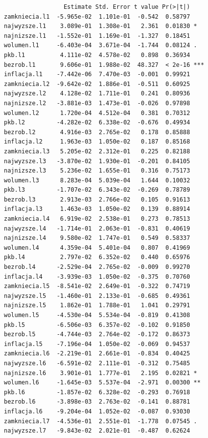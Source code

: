 \documentclass[
  polish,
  letterpaper,
  DIV=11,
  numbers=noendperiod]{scrartcl}
\begin{document}
\begin{verbatim}
                 Estimate Std. Error t value Pr(>|t|)    
zamkniecia.l1  -5.965e-02  1.101e-01  -0.542  0.58797    
najwyzsze.l1    3.089e-01  1.308e-01   2.361  0.01830 *  
najnizsze.l1   -1.552e-01  1.169e-01  -1.327  0.18451    
wolumen.l1     -6.403e-04  3.671e-04  -1.744  0.08124 .  
pkb.l1          4.111e-02  4.578e-02   0.898  0.36934    
bezrob.l1       9.606e-01  1.988e-02  48.327  < 2e-16 ***
inflacja.l1    -7.442e-06  7.470e-03  -0.001  0.99921    
zamkniecia.l2  -9.642e-02  1.886e-01  -0.511  0.60925    
najwyzsze.l2    4.128e-02  1.711e-01   0.241  0.80936    
najnizsze.l2   -3.881e-03  1.473e-01  -0.026  0.97898    
wolumen.l2      1.720e-04  4.512e-04   0.381  0.70312    
pkb.l2         -4.282e-02  6.338e-02  -0.676  0.49934    
bezrob.l2       4.916e-03  2.765e-02   0.178  0.85888    
inflacja.l2     1.963e-03  1.050e-02   0.187  0.85168    
zamkniecia.l3   5.205e-02  2.312e-01   0.225  0.82188    
najwyzsze.l3   -3.870e-02  1.930e-01  -0.201  0.84105    
najnizsze.l3    5.236e-02  1.655e-01   0.316  0.75173    
wolumen.l3      8.283e-04  5.039e-04   1.644  0.10032    
pkb.l3         -1.707e-02  6.343e-02  -0.269  0.78789    
bezrob.l3       2.913e-03  2.766e-02   0.105  0.91613    
inflacja.l3     1.463e-03  1.050e-02   0.139  0.88914    
zamkniecia.l4   6.919e-02  2.538e-01   0.273  0.78513    
najwyzsze.l4   -1.714e-01  2.063e-01  -0.831  0.40619    
najnizsze.l4    9.580e-02  1.747e-01   0.549  0.58337    
wolumen.l4      4.359e-04  5.401e-04   0.807  0.41969    
pkb.l4          2.797e-02  6.352e-02   0.440  0.65976    
bezrob.l4      -2.529e-04  2.765e-02  -0.009  0.99270    
inflacja.l4    -3.939e-03  1.050e-02  -0.375  0.70760    
zamkniecia.l5  -8.541e-02  2.649e-01  -0.322  0.74719    
najwyzsze.l5   -1.460e-01  2.133e-01  -0.685  0.49361    
najnizsze.l5    1.862e-01  1.788e-01   1.041  0.29791    
wolumen.l5     -4.530e-04  5.534e-04  -0.819  0.41308    
pkb.l5         -6.506e-03  6.357e-02  -0.102  0.91850    
bezrob.l5      -4.744e-03  2.764e-02  -0.172  0.86373    
inflacja.l5    -7.196e-04  1.050e-02  -0.069  0.94537    
zamkniecia.l6  -2.219e-01  2.661e-01  -0.834  0.40425    
najwyzsze.l6   -6.591e-02  2.111e-01  -0.312  0.75485    
najnizsze.l6    3.901e-01  1.777e-01   2.195  0.02821 *  
wolumen.l6     -1.645e-03  5.537e-04  -2.971  0.00300 ** 
pkb.l6         -1.857e-02  6.328e-02  -0.293  0.76918    
bezrob.l6      -3.898e-03  2.763e-02  -0.141  0.88781    
inflacja.l6    -9.204e-04  1.052e-02  -0.087  0.93030    
zamkniecia.l7  -4.536e-01  2.551e-01  -1.778  0.07545 .  
najwyzsze.l7   -9.843e-02  2.021e-01  -0.487  0.62624    

\end{verbatim}
\end{document}
